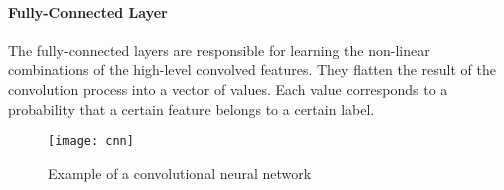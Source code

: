 \paragraph{Fully-Connected Layer}
The fully-connected layers are responsible for learning the non-linear combinations of the high-level convolved features.
They flatten the result of the convolution process into a vector of values.
Each value corresponds to a probability that a certain feature belongs to a certain label.

\begin{figure}[t]
  \centering
  \texttt{[image: cnn]}
  \caption{Example of a convolutional neural network}
  \label{fig:cnn}
\end{figure}
